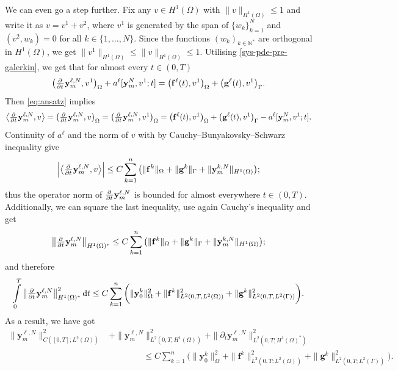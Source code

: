 \documentclass[11pt]{article}
\newcommand{\N}{\mathbb{N}}
\newcommand{\by}{\mathbf{y}}
\begin{document}
	We can even go a step further. Fix any \(v\in H^1(\Omega)\) with \(\|v\|_{H^1(\Omega)} \leq 1\) and write it as \( v = v^1 + v^2\), where \(v^1\) is generated by the span of \( \{w_k\}_{k=1}^N\) and \( (v^2,w_k) = 0\) for all \( k \in \{1,\ldots,N\}\). Since the functions \( (w_k)_{k\in \N^*}\) are orthogonal in \(H^1(\Omega)\), we get \( \|v^1\|_{H^1(\Omega)} \leq \|v\|_{H^1(\Omega)} \leq 1 \). Utilising \eqref{sys-pde-pre-galerkin}, we get that for almost every \(t\in (0,T)\)
	\[
		\big(\pd{ }{t} \by_m^{\ell,N}, v^1\big)_\Omega + 
		a^\ell [\mathbf y_m^{N}, v^1; t] 
		=
		\big( \mathbf{f}^\ell (t), v^1 \big)_{\Omega} + \big(\mathbf{g}^\ell (t),  v^1 \big)_{\Gamma}.
	\]
	Then \eqref{eq:ansatz} implies
	\[
		\big\langle \pd{ }{t} \by_m^{\ell,N}, v \big\rangle =
		\big(\pd{ }{t} \by_m^{\ell,N}, v\big)_\Omega =
		\big(\pd{ }{t} \by_m^{\ell,N}, v^1\big)_\Omega 
		=
		\big( \mathbf{f}^\ell (t), v^1 \big)_{\Omega} + \big(\mathbf{g}^\ell (t),  v^1 \big)_{\Gamma}
		- a^\ell [\mathbf y_m^{N}, v^1; t] .
	\]
	Continuity of \(a^\ell\) and the norm of \(v\) with by Cauchy--Bunyakovsky--Schwarz inequality give
	\[
		\Big| \big\langle \pd{ }{t} \by_m^{\ell,N}, v \big\rangle \Big|
		\leq C \sum_{k=1}^n
		\big( \|\mathbf{f}^k\|_{\Omega} + \|\mathbf{g}^k\|_{\Gamma} + \|\by_m^{k,N}\|_{H^1(\Omega)} \big);
	\]
	thus the operator norm of \(\pd{ }{t} \by_m^{\ell,N}\) is bounded for almost everywhere \(t\in (0,T)\). Additionally, we can square the last inequality, use again Cauchy's inequality and get
	\[
		\big\| \pd{ }{t} \by_m^{\ell,N} \big\|_{H^1(\Omega)^*} 
		\leq C \sum_{k=1}^n \big( \|\mathbf{f}^k\|_{\Omega} + \|\mathbf{g}^k\|_{\Gamma} + \|\by_m^{k,N}\|_{H^1(\Omega)} \big) ;
	\]
	and therefore
	\begin{align*}
		\int\limits_0^T \big\| \pd{ }{t} \by_m^{\ell,N} \big\|^2_{H^1(\Omega)^*} \dif t 
		\leq C\sum_{k=1}^n \bigg(  \| \by_0^k \|^2_\Omega + \|\mathbf{f}^k\|^2_{L^2(0,T, L^2(\Omega))} + \|\mathbf{g}^k\|^2_{L^2(0,T, L^2(\Gamma))} \bigg).
	\end{align*}
	As a result, we have got
	\begin{equation}
	\label{eq:energy-estimates}
	\begin{aligned}
		\| \by_m^{\ell,N} \|^2_{C([0,T];L^2(\Omega) )} 
		&+ \|\by_m^{\ell,N} \|^2_{L^2(0,T; H^1(\Omega))}
		+  \| \partial_t \by_m^{\ell,N} \|^2_{L^2(0,T;H^1(\Omega)^*)}
		\\
		&\qquad\qquad\leq 
		C \sum_{k=1}^n \bigg(  \| \by_0^k \|^2_\Omega + \|\mathbf{f}^k\|^2_{L^2(0,T;L^2(\Omega))} + \|\mathbf{g}^k\|^2_{L^2(0,T;L^2(\Gamma))} \bigg).
	\end{aligned}
	\end{equation}
	
\end{document}
